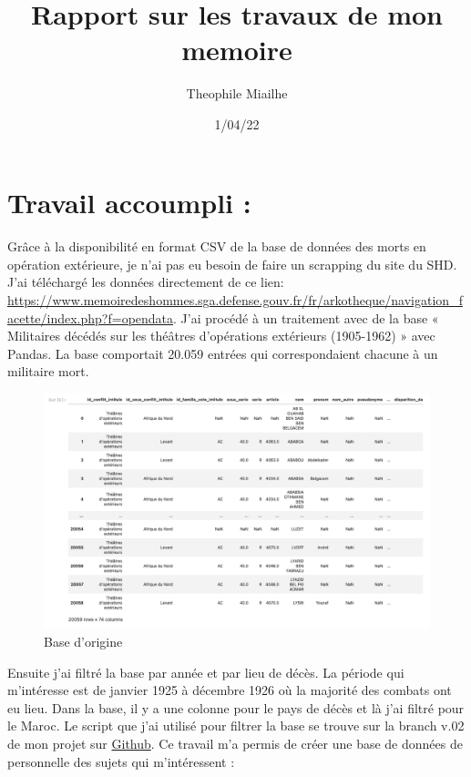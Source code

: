 \documentclass[12pt]{article}
\title{Rapport sur les travaux de mon memoire}
\author{Theophile Miailhe}
\date{1/04/22}
\begin{document}
\maketitle

\section{Travail accoumpli :}
\paragraph*{}
Grâce à la disponibilité en format CSV de la base de données des morts en opération extérieure, je n'ai pas eu besoin de faire un scrapping du site du SHD. J'ai téléchargé les données directement de ce lien: \url{https://www.memoiredeshommes.sga.defense.gouv.fr/fr/arkotheque/navigation_facette/index.php?f=opendata}. J'ai procédé à un traitement avec de la  base « Militaires décédés sur les théâtres d'opérations extérieurs (1905-1962) » avec Pandas.
La base comportait 20.059 entrées qui correspondaient chacune à un militaire mort.  
\begin{figure}[htp]
    \centering
    \includegraphics[scale=0.27]{dbpic.png}
    \caption{Base d'origine}
    \label{fig:Base d'origine}
\end{figure}Ensuite j'ai filtré la base par année et par lieu de décès. La période qui m'intéresse est de janvier 1925 à décembre 1926 où la majorité des combats ont eu lieu. Dans la base, il y a une colonne pour le pays de décès et là j'ai filtré pour le Maroc. Le script que j'ai utilisé pour filtrer la base se trouve sur la branch v.02 de mon projet sur \href{https://github.com/the0phil3/projetMemoire/tree/v.02}{Github}. Ce travail m'a permis de créer une base de données de personnelle des sujets qui m'intéressent : 
  
\end{document}
